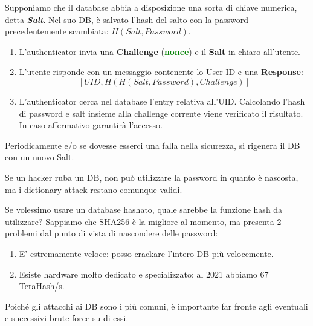 \begin{proposition}
Supponiamo che il database abbia a disposizione una sorta di chiave numerica, detta \textit{\textbf{Salt}}. Nel suo DB, è salvato l'hash del salto con la password precedentemente scambiata: $H(Salt, Password)$.
\begin{enumerate}
    \item L'authenticator invia una \textbf{Challenge} (\textbf{\textcolor{green}{nonce}}) e il \textbf{Salt} in chiaro all'utente. 
    \item L'utente risponde con un messaggio contenente lo User ID e una \textbf{Response}:
    \[[UID,H(H(Salt, Password),Challenge)]\]
    \item L'authenticator cerca nel database l'entry relativa all'UID. Calcolando l'hash di password e salt insieme alla challenge corrente viene verificato il risultato. In caso affermativo garantirà l’accesso.
\end{enumerate}
Periodicamente e/o se dovesse esserci una falla nella sicurezza, si rigenera il DB con un nuovo Salt. 
\end{proposition}
\begin{remark}
Se un hacker ruba un DB, non può utilizzare la password in quanto è nascosta, ma i dictionary-attack restano comunque validi. 
\end{remark}
\begin{note}Se volessimo usare un database hashato, quale sarebbe la funzione hash da utilizzare? Sappiamo che SHA256 è la migliore al momento, ma presenta 2 problemi dal punto di vista di nascondere delle password:
\begin{enumerate}
    \item E' estremamente veloce: posso crackare l'intero DB più velocemente.
    \item Esiste hardware molto dedicato e specializzato: al 2021 abbiamo 67 TeraHash/s.
\end{enumerate}
Poiché gli attacchi ai DB sono i più comuni, è importante far fronte agli eventuali e successivi brute-force su di essi.
\end{note}\pagebreak

